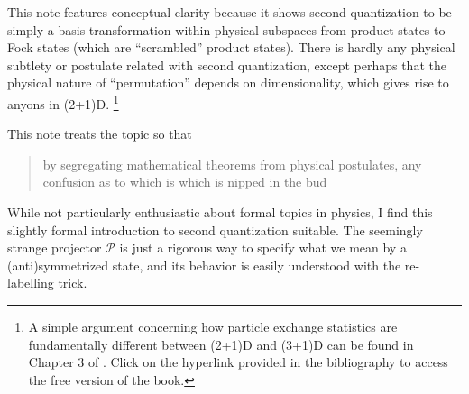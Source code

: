 \documentclass{article}
\theoremstyle{definition}
\numberwithin{equation}{section}
\begin{document}
This note features conceptual clarity because
it shows second quantization to be simply a basis
transformation within physical subspaces from product states to 
Fock states (which are ``scrambled'' product states). 
There is hardly any physical subtlety or postulate 
related with second quantization, except perhaps 
that 
the physical nature of ``permutation'' depends on 
dimensionality, which gives rise to anyons in (2+1)D. 
\footnote{
    A simple argument concerning 
    how particle exchange statistics 
    are fundamentally different between 
    (2+1)D and (3+1)D can be found in 
    Chapter 3 of \cite{simon_topological_2023}.
    Click on the hyperlink provided 
    in the bibliography to access 
    the free version of the book.
}

This note treats 
the topic so that 
\blockcquote{shankar_principles_1994}{by segregating mathematical theorems from physical postulates, any confusion as to which is which is nipped in the bud}. 
While not particularly enthusiastic about formal topics in physics, 
I find this slightly formal introduction to second quantization suitable.
The seemingly strange projector $\mathcal{P}$ is just
a rigorous way to specify what we mean by
a (anti)symmetrized state,
and its behavior is easily understood with the
re-labelling trick.

\printbibliography
\end{document}
